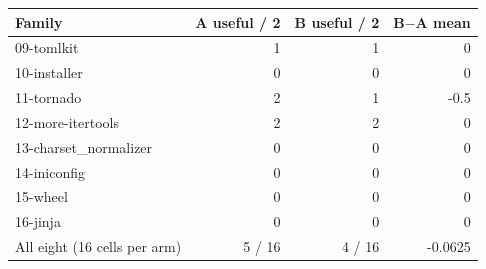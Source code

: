 \begin{tabular}{lrrr}
\hline
Family & A useful / 2 & B useful / 2 & B$-$A mean \\
\hline
09-tomlkit & 1 & 1 & 0 \\
10-installer & 0 & 0 & 0 \\
11-tornado & 2 & 1 & -0.5 \\
12-more-itertools & 2 & 2 & 0 \\
13-charset\_normalizer & 0 & 0 & 0 \\
14-iniconfig & 0 & 0 & 0 \\
15-wheel & 0 & 0 & 0 \\
16-jinja & 0 & 0 & 0 \\
\hline
All eight (16 cells per arm) & 5 / 16 & 4 / 16 & -0.0625 \\
\hline
\end{tabular}
